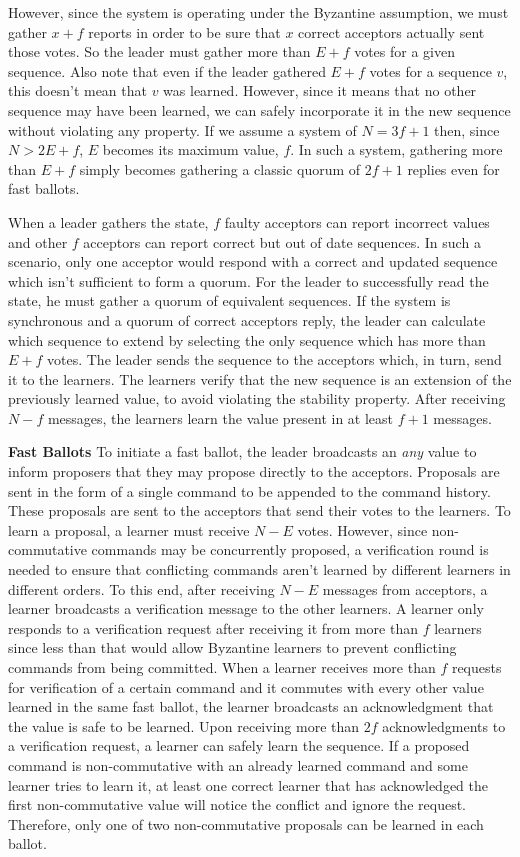 However, since the system is operating under the Byzantine assumption, we must gather $x+f$ reports in order to be sure that $x$ correct acceptors actually sent those votes. So the leader must gather more than $E+f$ votes for a given sequence. Also note that even if the leader gathered $E+f$ votes for a sequence $v$, this doesn't mean that $v$ was learned. However, since it means that no other sequence may have been learned, we can safely incorporate it in the new sequence without violating any property. If we assume a system of $N = 3f+1$ then, since $N > 2E+f$, $E$ becomes its maximum value, $f$. In such a system, gathering more than $E+f$ simply becomes gathering a classic quorum of $2f+1$ replies even for fast ballots.\par
When a leader gathers the state, $f$ faulty acceptors can report incorrect values and other $f$ acceptors can report correct but out of date sequences. In such a scenario, only one acceptor would respond with a correct and updated sequence which isn't sufficient to form a quorum. For the leader to successfully read the state, he must gather a quorum of equivalent sequences. If the system is synchronous and a quorum of correct acceptors reply, the leader can calculate which sequence to extend by selecting the only sequence which has more than $E+f$ votes. The leader sends the sequence to the acceptors which, in turn, send it to the learners. The learners verify that the new sequence is an extension of the previously learned value, to avoid violating the stability property. After receiving $N-f$ messages, the learners learn the value present in at least $f+1$ messages. \par
\textbf{Fast Ballots} To initiate a fast ballot, the leader broadcasts an \textit{any} value to inform proposers that they may propose directly to the acceptors. Proposals are sent in the form of a single command to be appended to the command history. These proposals are sent to the acceptors that send their votes to the learners. To learn a proposal, a learner must receive $N-E$ votes. However, since non-commutative commands may be concurrently proposed, a verification round is needed to ensure that conflicting commands aren't learned by different learners in different orders. To this end, after receiving $N-E$ messages from acceptors, a learner broadcasts a verification message to the other learners. A learner only responds to a verification request after receiving it from more than $f$ learners since less than that would allow Byzantine learners to prevent conflicting commands from being committed. When a learner receives more than $f$ requests for verification of a certain command and it commutes with every other value learned in the same fast ballot, the learner broadcasts an acknowledgment that the value is safe to be learned. Upon receiving more than $2f$ acknowledgments to a verification request, a learner can safely learn the sequence. If a proposed command is non-commutative with an already learned command and some learner tries to learn it, at least one correct learner that has acknowledged the first non-commutative value will notice the conflict and ignore the request. Therefore, only one of two non-commutative proposals can be learned in each ballot. \par
